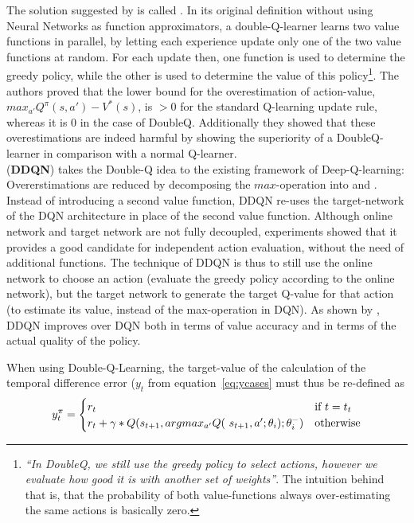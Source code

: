 The solution suggested by \cite{van_hasselt_deep_2015} is called . In its original definition without using Neural Networks as function approximators, a double-Q-learner learns two value functions in parallel, by letting each experience update only one of the two value functions at random. For each update then, one function is used to determine the greedy policy, while the other is used to determine the value of this policy\footnote{\textit{``In DoubleQ, we still use the greedy policy to select actions, however we evaluate how good it is with another set of weights''}. The intuition behind that is, that the probability of both value-functions always over-estimating the same actions is basically zero.}. The authors proved that the lower bound for the overestimation of action-value, $max_{a'}Q^\pi(s,a') - V^*(s)$, is $>0$ for the standard Q-learning update rule, whereas it is $0$ in the case of DoubleQ. Additionally they showed that these overestimations are indeed harmful by showing the superiority of a DoubleQ-learner in comparison with a normal Q-learner.\\

 (\textbf{DDQN}) takes the Double-Q idea to the existing framework of Deep-Q-learning: Overerstimations are reduced by decomposing the $max$-operation into  and . Instead of introducing a second value function, DDQN re-uses the target-network of the DQN architecture in place of the second value function. Although online network and target network are not fully decoupled, experiments showed that it provides a good candidate for independent action evaluation, without the need of additional functions. The technique of DDQN is thus to still use the online network to choose an action (evaluate the greedy policy according to the online network), but the target network to generate the target Q-value for that action (to estimate its value, instead of the max-operation in DQN). As shown by \cite{van_hasselt_deep_2015}, DDQN improves over DQN both in terms of value accuracy and in terms of the actual quality of the policy. 

When using Double-Q-Learning, the target-value of the calculation of the temporal difference error ($y_t$ from equation~\ref{eq:ycases} must thus be re-defined as 
\begin{equation}
		y_t^\pi = \begin{cases} 
	r_t & \text{if } t = t_t\\
	r_t + \gamma * Q(s_{t+1}, argmax_{a'} Q($  $s_{t+1}, a'; \theta_i); \theta_i^-) & \text{otherwise} 
	\end{cases} %
\end{equation}

